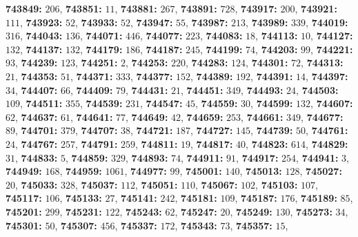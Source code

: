 \textsf{\bfseries 743849:} $206$, \textsf{\bfseries 743851:} $11$, \textsf{\bfseries 743881:} $267$, \textsf{\bfseries 743891:} $728$, \textsf{\bfseries 743917:} $200$, \textsf{\bfseries 743921:} $111$, \textsf{\bfseries 743923:} $52$, \textsf{\bfseries 743933:} $52$, \textsf{\bfseries 743947:} $55$, \textsf{\bfseries 743987:} $213$, \textsf{\bfseries 743989:} $339$, \textsf{\bfseries 744019:} $316$, \textsf{\bfseries 744043:} $136$, \textsf{\bfseries 744071:} $446$, \textsf{\bfseries 744077:} $223$, \textsf{\bfseries 744083:} $18$, \textsf{\bfseries 744113:} $10$, \textsf{\bfseries 744127:} $132$, \textsf{\bfseries 744137:} $132$, \textsf{\bfseries 744179:} $186$, \textsf{\bfseries 744187:} $245$, \textsf{\bfseries 744199:} $74$, \textsf{\bfseries 744203:} $99$, \textsf{\bfseries 744221:} $93$, \textsf{\bfseries 744239:} $123$, \textsf{\bfseries 744251:} $2$, \textsf{\bfseries 744253:} $220$, \textsf{\bfseries 744283:} $124$, \textsf{\bfseries 744301:} $72$, \textsf{\bfseries 744313:} $21$, \textsf{\bfseries 744353:} $51$, \textsf{\bfseries 744371:} $333$, \textsf{\bfseries 744377:} $152$, \textsf{\bfseries 744389:} $192$, \textsf{\bfseries 744391:} $14$, \textsf{\bfseries 744397:} $34$, \textsf{\bfseries 744407:} $66$, \textsf{\bfseries 744409:} $79$, \textsf{\bfseries 744431:} $21$, \textsf{\bfseries 744451:} $349$, \textsf{\bfseries 744493:} $24$, \textsf{\bfseries 744503:} $109$, \textsf{\bfseries 744511:} $355$, \textsf{\bfseries 744539:} $231$, \textsf{\bfseries 744547:} $45$, \textsf{\bfseries 744559:} $30$, \textsf{\bfseries 744599:} $132$, \textsf{\bfseries 744607:} $62$, \textsf{\bfseries 744637:} $61$, \textsf{\bfseries 744641:} $77$, \textsf{\bfseries 744649:} $42$, \textsf{\bfseries 744659:} $253$, \textsf{\bfseries 744661:} $349$, \textsf{\bfseries 744677:} $89$, \textsf{\bfseries 744701:} $379$, \textsf{\bfseries 744707:} $38$, \textsf{\bfseries 744721:} $187$, \textsf{\bfseries 744727:} $145$, \textsf{\bfseries 744739:} $50$, \textsf{\bfseries 744761:} $24$, \textsf{\bfseries 744767:} $257$, \textsf{\bfseries 744791:} $259$, \textsf{\bfseries 744811:} $19$, \textsf{\bfseries 744817:} $40$, \textsf{\bfseries 744823:} $614$, \textsf{\bfseries 744829:} $31$, \textsf{\bfseries 744833:} $5$, \textsf{\bfseries 744859:} $329$, \textsf{\bfseries 744893:} $74$, \textsf{\bfseries 744911:} $91$, \textsf{\bfseries 744917:} $254$, \textsf{\bfseries 744941:} $3$, \textsf{\bfseries 744949:} $168$, \textsf{\bfseries 744959:} $1061$, \textsf{\bfseries 744977:} $99$, \textsf{\bfseries 745001:} $140$, \textsf{\bfseries 745013:} $128$, \textsf{\bfseries 745027:} $20$, \textsf{\bfseries 745033:} $328$, \textsf{\bfseries 745037:} $112$, \textsf{\bfseries 745051:} $110$, \textsf{\bfseries 745067:} $102$, \textsf{\bfseries 745103:} $107$, \textsf{\bfseries 745117:} $106$, \textsf{\bfseries 745133:} $27$, \textsf{\bfseries 745141:} $242$, \textsf{\bfseries 745181:} $109$, \textsf{\bfseries 745187:} $176$, \textsf{\bfseries 745189:} $85$, \textsf{\bfseries 745201:} $299$, \textsf{\bfseries 745231:} $122$, \textsf{\bfseries 745243:} $62$, \textsf{\bfseries 745247:} $20$, \textsf{\bfseries 745249:} $130$, \textsf{\bfseries 745273:} $34$, \textsf{\bfseries 745301:} $50$, \textsf{\bfseries 745307:} $456$, \textsf{\bfseries 745337:} $172$, \textsf{\bfseries 745343:} $73$, \textsf{\bfseries 745357:} $15$, 
